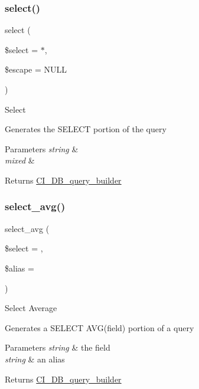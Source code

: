 \subsubsection{\texorpdfstring{select()}{select()}}
{\footnotesize\ttfamily select (\begin{DoxyParamCaption}\item[{}]{\$select = {\ttfamily \textquotesingle{}$\ast$\textquotesingle{}},  }\item[{}]{\$escape = {\ttfamily NULL} }\end{DoxyParamCaption})}

Select

Generates the S\+E\+L\+E\+CT portion of the query


\begin{DoxyParams}{Parameters}
{\em string} & \\
\hline
{\em mixed} & \\
\hline
\end{DoxyParams}
\begin{DoxyReturn}{Returns}
\mbox{\hyperlink{class_c_i___d_b__query__builder}{C\+I\+\_\+\+D\+B\+\_\+query\+\_\+builder}} 
\end{DoxyReturn}
\mbox{\label{class_c_i___d_b__query__builder_a0377f6833e394c977823e21413772761}} 
\subsubsection{\texorpdfstring{select\+\_\+avg()}{select\_avg()}}
{\footnotesize\ttfamily select\+\_\+avg (\begin{DoxyParamCaption}\item[{}]{\$select = {\ttfamily \textquotesingle{}\textquotesingle{}},  }\item[{}]{\$alias = {\ttfamily \textquotesingle{}\textquotesingle{}} }\end{DoxyParamCaption})}

Select Average

Generates a S\+E\+L\+E\+CT A\+V\+G(field) portion of a query


\begin{DoxyParams}{Parameters}
{\em string} & the field \\
\hline
{\em string} & an alias \\
\hline
\end{DoxyParams}
\begin{DoxyReturn}{Returns}
\mbox{\hyperlink{class_c_i___d_b__query__builder}{C\+I\+\_\+\+D\+B\+\_\+query\+\_\+builder}} 
\end{DoxyReturn}
\mbox{\label{class_c_i___d_b__query__builder_a4eac30ba8703ba8f62664e3b4ea1a177}} 
